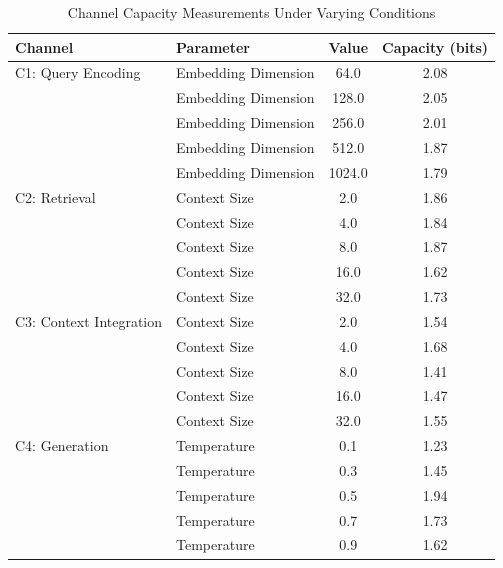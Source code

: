 \begin{table}[t]
\centering
\caption{Channel Capacity Measurements Under Varying Conditions}
\label{tab:channel_capacity}
\begin{tabular}{llcc}
\toprule
Channel & Parameter & Value & Capacity (bits) \\
\midrule
C1: Query Encoding & Embedding Dimension & 64.0 & 2.08 \\
 & Embedding Dimension & 128.0 & 2.05 \\
 & Embedding Dimension & 256.0 & 2.01 \\
 & Embedding Dimension & 512.0 & 1.87 \\
 & Embedding Dimension & 1024.0 & 1.79 \\
C2: Retrieval & Context Size & 2.0 & 1.86 \\
 & Context Size & 4.0 & 1.84 \\
 & Context Size & 8.0 & 1.87 \\
 & Context Size & 16.0 & 1.62 \\
 & Context Size & 32.0 & 1.73 \\
C3: Context Integration & Context Size & 2.0 & 1.54 \\
 & Context Size & 4.0 & 1.68 \\
 & Context Size & 8.0 & 1.41 \\
 & Context Size & 16.0 & 1.47 \\
 & Context Size & 32.0 & 1.55 \\
C4: Generation & Temperature & 0.1 & 1.23 \\
 & Temperature & 0.3 & 1.45 \\
 & Temperature & 0.5 & 1.94 \\
 & Temperature & 0.7 & 1.73 \\
 & Temperature & 0.9 & 1.62 \\
\bottomrule
\end{tabular}
\end{table}
